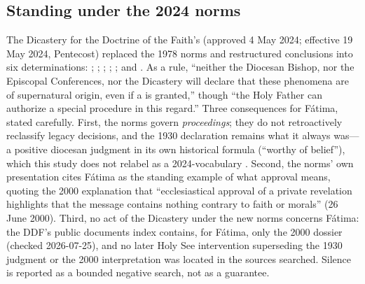 \subsection{Standing under the 2024 norms}

The Dicastery for the Doctrine of the Faith's 
(approved 4 May 2024; effective 19 May 2024, Pentecost) replaced the
1978 norms and restructured conclusions into six determinations:
; ; ;
; ; and
. As a rule, ``neither the
Diocesan Bishop, nor the Episcopal Conferences, nor the Dicastery
will declare that these phenomena are of supernatural origin, even if
a  is granted,'' though ``the Holy Father can
authorize a special procedure in this regard.'' Three consequences for F\'atima, stated
carefully. First, the norms govern \emph{proceedings}; they do not
retroactively reclassify legacy decisions, and the 1930 declaration
remains what it always was---a positive diocesan judgment in its own
historical formula (``worthy of belief''), which this study does not
relabel as a 2024-vocabulary . Second, the norms'
own presentation cites F\'atima as the standing example of what
approval means, quoting the 2000 explanation that ``ecclesiastical
approval of a private revelation highlights that the message contains
nothing contrary to faith or morals'' (26 June 2000). Third, no act
of the Dicastery under the new norms concerns F\'atima: the DDF's
public documents index contains, for F\'atima, only the 2000
 dossier (checked 2026-07-25), and no later
Holy See intervention superseding the 1930 judgment or the 2000
interpretation was located in the sources searched. Silence is
reported as a bounded negative search, not as a guarantee.

